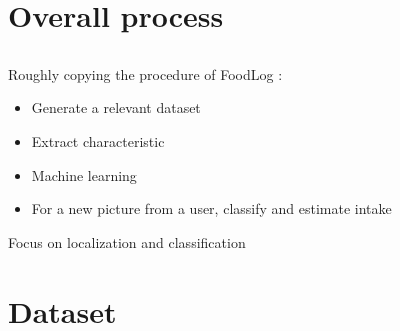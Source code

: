 \documentclass[aspectratio=169]{beamer}
\let\oldsection\section
\renewcommand{\section}[1]{
    \oldsection{#1}	
    \subsection{}
}
\newenvironment{myframe}[1][t]{\begin{frame}[#1]{\secname}{\subsecname}}{\end{frame}}
\begin{document}
     \section{Overall process}
     
     \begin{myframe}[c]
         Roughly copying the procedure of FoodLog \cite{Kitamura2009, Kitamura2008, DeSilva2011, Aizawa2013, Kagaya2014}:
         \begin{itemize}
             \item Generate a relevant dataset
             \item Extract characteristic
             \item Machine learning
             \item For a new picture from a user, classify and estimate intake
         \end{itemize}
         Focus on localization and classification
     \end{myframe}
    
%                
%                

    \section{Dataset}
    
\end{document}
